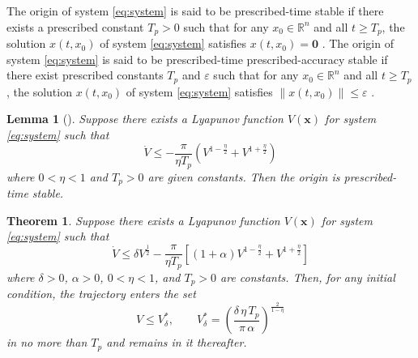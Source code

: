 \documentclass[journal]{new-aiaa}
\newtheorem{theorem}{Theorem}
\newtheorem{lemma}{Lemma}
\begin{document}
The origin of system \eqref{eq:system} is said to be prescribed-time stable if there exists a 
prescribed constant $T_p > 0$ such that for any $x_0 \in \mathbb{R}^n$ and all $t \geq T_p$, 
the solution $x(t, x_0)$ of system \eqref{eq:system} satisfies $x(t, x_0) = \mathbf{0}$ \cite{sanchez-torres_predefined-time_2015}. 
The origin of system \eqref{eq:system} is said to be prescribed-time prescribed-accuracy stable 
if there exist prescribed constants $T_p$ and $\varepsilon$ such that for any $x_0 \in \mathbb{R}^n$ and all $t \geq T_p$, the solution $x(t, x_0)$ of system \eqref{eq:system} satisfies $\|x(t, x_0)\| \leq \varepsilon$ \cite{xiao_scaling-transformation-based_2025}.


\begin{lemma}[\cite{anguiano-gijon_predefined-time_2019}]\label{lem:PT}
Suppose there exists a Lyapunov function $V(\boldsymbol{x})$ for system \eqref{eq:system} such that
\begin{equation}
\dot V \le -\frac{\pi}{\eta T_p}\left(V^{1-\tfrac{\eta}{2}}+V^{1+\tfrac{\eta}{2}}\right)
\label{eq:lemma_PT_cond}
\end{equation}
where $0<\eta<1$ and $T_p>0$ are given constants. Then the origin is prescribed-time stable.
\end{lemma}

\begin{theorem}\label{thm:practical_PT}
Suppose there exists a Lyapunov function $V(\boldsymbol{x})$ for system \eqref{eq:system} such that
\begin{equation}
\dot V \le \delta V^{\tfrac{1}{2}} - \frac{\pi}{\eta T_p}\left[(1+\alpha) V^{1-\tfrac{\eta}{2}}+V^{1+\tfrac{\eta}{2}}\right]
\label{eq:theorem1_condition}
\end{equation}
where $\delta>0$, $\alpha>0$, $0<\eta<1$, and $T_p>0$ are constants. Then, for any initial condition, the trajectory enters the set
\begin{equation}
V \le V^*_\delta,\qquad 
V^*_\delta = \left(\frac{\delta\,\eta\,T_p}{\pi\,\alpha}\right)^{\frac{2}{1-\eta}}
\label{eq:V_star_delta}
\end{equation}
in no more than $T_p$ and remains in it thereafter.
\end{theorem}
\end{document}
